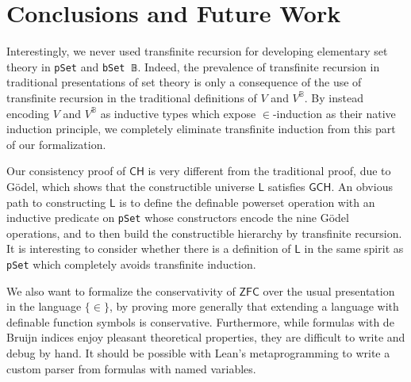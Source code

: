 \documentclass[sigplan,screen]{acmart}
\newcommand{\lil}{\lstinline}
\newcommand{\CH}{\mathsf{CH}}
\theoremstyle{definition}
\begin{document}
\section{Conclusions and Future Work}
\label{sect:conclusions}

Interestingly, we never used transfinite recursion for developing elementary set theory in \lil{pSet} and \lil{bSet 𝔹}. Indeed, the prevalence of transfinite recursion in traditional presentations of set theory is only a consequence of the use of transfinite recursion in the traditional definitions of \(V\) and \(V^{\mathbb{B}}\). By instead encoding \(V\) and \(V^{\mathbb{B}}\) as inductive types which expose \(\in\)-induction as their native induction principle, we completely eliminate transfinite induction from this part of our formalization. %

Our consistency proof of \(\CH\) is very different from the traditional proof, due to G\"odel, which shows that the constructible universe \(\mathsf{L}\) satisfies \(\mathsf{GCH}\). An obvious path to constructing \(\mathsf{L}\) is to define the definable powerset operation with an inductive predicate on \lil{pSet} whose constructors encode the nine G\"odel operations, and to then build the constructible hierarchy by transfinite recursion. It is interesting to consider whether there is a definition of \(\mathsf{L}\) in the same spirit as \lil{pSet} which completely avoids transfinite induction.

We also want to formalize the conservativity of \(\mathsf{ZFC}\) over the usual presentation in the language \(\{\in\}\), by proving more generally that extending a language with definable function symbols is conservative.
Furthermore, while formulas with de Bruijn indices enjoy pleasant theoretical properties, they are difficult to write and debug by hand. It should be possible with Lean's metaprogramming to write a custom parser from formulas with named variables.
\end{document}
